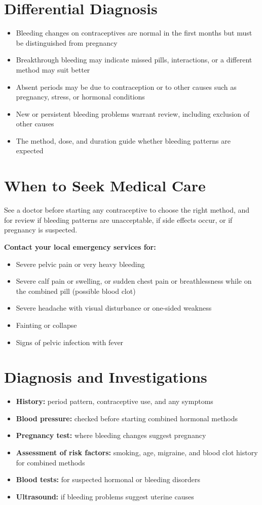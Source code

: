 \section*{Differential Diagnosis}
\begin{itemize}
    \item Bleeding changes on contraceptives are normal in the first months but must be distinguished from pregnancy
    \item Breakthrough bleeding may indicate missed pills, interactions, or a different method may suit better
    \item Absent periods may be due to contraception or to other causes such as pregnancy, stress, or hormonal conditions
    \item New or persistent bleeding problems warrant review, including exclusion of other causes
    \item The method, dose, and duration guide whether bleeding patterns are expected
\end{itemize}

\section*{When to Seek Medical Care}
See a doctor before starting any contraceptive to choose the right method, and for review if bleeding patterns are unacceptable, if side effects occur, or if pregnancy is suspected.

\textbf{Contact your local emergency services for:}
\begin{itemize}
    \item Severe pelvic pain or very heavy bleeding
    \item Severe calf pain or swelling, or sudden chest pain or breathlessness while on the combined pill (possible blood clot)
    \item Severe headache with visual disturbance or one-sided weakness
    \item Fainting or collapse
    \item Signs of pelvic infection with fever
\end{itemize}

\section*{Diagnosis and Investigations}
\begin{itemize}
    \item \textbf{History:} period pattern, contraceptive use, and any symptoms
    \item \textbf{Blood pressure:} checked before starting combined hormonal methods
    \item \textbf{Pregnancy test:} where bleeding changes suggest pregnancy
    \item \textbf{Assessment of risk factors:} smoking, age, migraine, and blood clot history for combined methods
    \item \textbf{Blood tests:} for suspected hormonal or bleeding disorders
    \item \textbf{Ultrasound:} if bleeding problems suggest uterine causes
\end{itemize}

